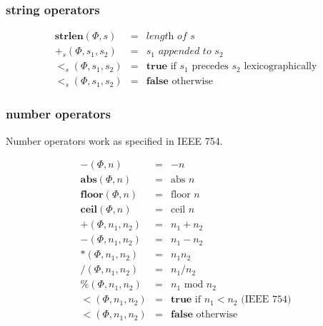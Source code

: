 \documentclass[draft, 10pt]{article}
\newcommand{\num}[0]{n}
\newcommand{\str}[0]{s}
\newcommand{\true}[0]{\textbf{true}}
\newcommand{\false}[0]{\textbf{false}}
\newcommand{\opstrlen}[0]{\textbf{strlen}}
\newcommand{\opabs}[0]{\textbf{abs}}
\newcommand{\opfloor}[0]{\textbf{floor}}
\newcommand{\opceil}[0]{\textbf{ceil}}
\newcommand{\opntoc}[0]{\textbf{ntoc}}
\newcommand{\opcton}[0]{\textbf{cton}}
\newcommand{\opneg}[0]{-}
\newcommand{\opcharat}[0]{\textbf{char-at}}
\newcommand{\opadd}[0]{+}
\newcommand{\opsub}[0]{-}
\newcommand{\opmul}[0]{*}
\newcommand{\opdiv}[0]{/}
\newcommand{\opmod}[0]{\%}
\newcommand{\oplt}[0]{<}
\newcommand{\opstrplus}[0]{+_{\str}}
\newcommand{\opstrlt}[0]{<_{\str}}
\newcommand{\heap}[0]{\Phi}
\newcommand{\rununop}[3]{#1(#2,#3)}
\newcommand{\runbinop}[4]{#1(#2,#3,#4)}
\begin{document}
\subsubsection{string operators}

\[
\begin{array}{rcl}
\rununop{\opstrlen}{\heap}{\str} &=& \textit{length of $\str$} \\
\runbinop{\opstrplus}{\heap}{\str_1}{\str_2} &=& \str_1 \textit{ appended to } \str_2 \\
\runbinop{\opstrlt}{\heap}{\str_1}{\str_2} &=& \true \textrm{ if $\str_1$ precedes $\str_2$ lexicographically} \\
\runbinop{\opstrlt}{\heap}{\str_1}{\str_2} &=& \false \textrm{ otherwise} 
\end{array}
\]

\subsubsection{number operators}

Number operators work as specified in IEEE 754.

\[
\begin{array}{rcl}
\rununop{\opneg}{\heap}{\num} &=& -\num \\
\rununop{\opabs}{\heap}{\num} &=& \textrm{abs } \num \\
\rununop{\opfloor}{\heap}{\num} &=& \textrm{floor } \num \\
\rununop{\opceil}{\heap}{\num} &=& \textrm{ceil } \num \\
\runbinop{\opadd}{\heap}{\num_1}{\num_2} &=& \num_1 + \num_2 \\
\runbinop{\opsub}{\heap}{\num_1}{\num_2} &=& \num_1 - \num_2 \\
\runbinop{\opmul}{\heap}{\num_1}{\num_2} &=& \num_1 \num_2 \\
\runbinop{\opdiv}{\heap}{\num_1}{\num_2} &=& \num_1 / \num_2 \\
\runbinop{\opmod}{\heap}{\num_1}{\num_2} &=& \num_1 \textrm{ mod } \num_2 \\
\runbinop{\oplt}{\heap}{\num_1}{\num_2} &=& \true \textrm{ if $\num_1 < \num_2$ (IEEE 754)} \\
\runbinop{\oplt}{\heap}{\num_1}{\num_2} &=& \false \textrm{ otherwise}
\end{array}
\]
\end{document}
